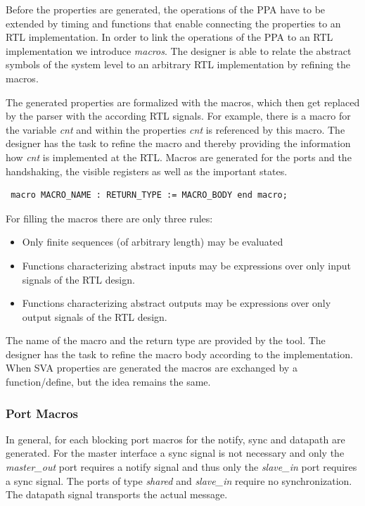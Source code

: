 Before the properties are generated, the operations of the PPA have to be extended by timing and functions that enable connecting the properties to an RTL implementation. 
In order to link the operations of the PPA to an RTL implementation we introduce \textit{macros}.
The designer is able to relate the abstract symbols of the system level to an arbitrary RTL implementation by refining the macros. 

The generated properties are formalized with the macros, which then get replaced by the parser with the according RTL signals.
For example, there is a macro for the variable \textit{cnt} and within the properties \textit{cnt} is referenced by this macro. 
The designer has the task to refine the macro and thereby providing the information how \textit{cnt} is implemented at the RTL. 
Macros are generated for the ports and the handshaking, the visible registers as well as the important states. 

\begin{verbatim} macro MACRO_NAME : RETURN_TYPE := MACRO_BODY end macro; 
\end{verbatim}
For filling the macros there are only three rules:
\begin{itemize}
\setlength\itemsep{0em}
\item Only finite sequences (of arbitrary length) may be evaluated
\item Functions characterizing abstract inputs may be expressions
over only input signals of the RTL design.
\item Functions characterizing abstract outputs may be expressions
over only output signals of the RTL design.
\end{itemize}
The name of the macro and the return type are provided by the tool. 
The designer has the task to refine the macro body according to the implementation.
When SVA properties are generated the macros are exchanged by a function/define, but the idea remains the same. 

\subsubsection{Port Macros}

In general, for each blocking port macros for the notify, sync and datapath are generated. 
For the master interface a sync signal is not necessary and only the \textit{master\_out} port requires a notify signal and thus only the \textit{slave\_in} port requires a sync signal.
The ports of type \textit{shared} and \textit{slave\_in} require no synchronization. 
The datapath signal transports the actual message.

